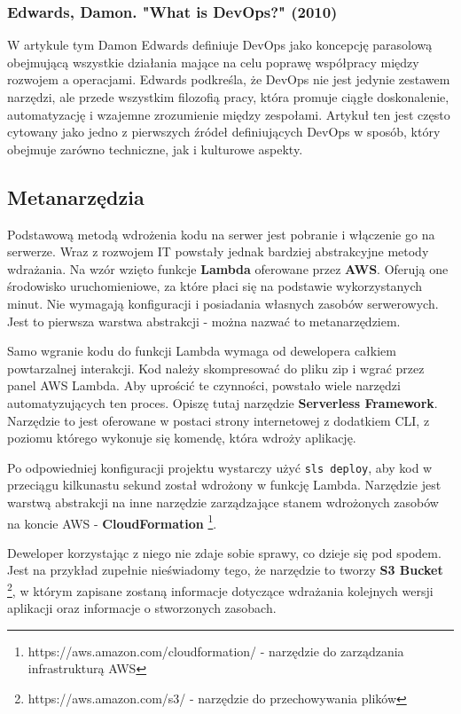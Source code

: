 \documentclass{article}
\begin{document}
\subsubsection{Edwards, Damon. "What is DevOps?" (2010)\cite{damonEdwards}}
W artykule tym Damon Edwards definiuje DevOps jako koncepcję parasolową obejmującą wszystkie działania mające na celu poprawę współpracy między rozwojem a operacjami. Edwards podkreśla, że DevOps nie jest jedynie zestawem narzędzi, ale przede wszystkim filozofią pracy, która promuje ciągłe doskonalenie, automatyzację i wzajemne zrozumienie między zespołami. Artykuł ten jest często cytowany jako jedno z pierwszych źródeł definiujących DevOps w sposób, który obejmuje zarówno techniczne, jak i kulturowe aspekty.

\subsection{Metanarzędzia} \label{subsectionMetaNarzedzia}

Podstawową metodą wdrożenia kodu na serwer jest pobranie i włączenie go na serwerze. Wraz z rozwojem IT powstały jednak bardziej abstrakcyjne metody wdrażania. Na wzór wzięto funkcje \textbf{Lambda} oferowane przez \textbf{AWS}. Oferują one środowisko uruchomieniowe, za które płaci się na podstawie wykorzystanych minut. Nie wymagają konfiguracji i posiadania własnych zasobów serwerowych. Jest to pierwsza warstwa abstrakcji - można nazwać to metanarzędziem.

Samo wgranie kodu do funkcji Lambda wymaga od dewelopera całkiem powtarzalnej interakcji. Kod należy skompresować do pliku zip i wgrać przez panel AWS Lambda. Aby uprościć te czynności, powstało wiele narzędzi automatyzujących ten proces. Opiszę tutaj narzędzie \textbf{Serverless Framework}. Narzędzie to jest oferowane w postaci strony internetowej z dodatkiem CLI, z poziomu którego wykonuje się komendę, która wdroży aplikację.

Po odpowiedniej konfiguracji projektu wystarczy użyć \lstinline|sls deploy|, aby kod w przeciągu kilkunastu sekund został wdrożony w funkcję Lambda. Narzędzie jest warstwą abstrakcji na inne narzędzie zarządzające stanem wdrożonych zasobów na koncie AWS - \textbf{CloudFormation} \footnote{https://aws.amazon.com/cloudformation/ - narzędzie do zarządzania infrastrukturą AWS}.

Deweloper korzystając z niego nie zdaje sobie sprawy, co dzieje się pod spodem. Jest na przykład zupełnie nieświadomy tego, że narzędzie to tworzy \textbf{S3 Bucket} \footnote{https://aws.amazon.com/s3/ - narzędzie do przechowywania plików}, w którym zapisane zostaną informacje dotyczące wdrażania kolejnych wersji aplikacji oraz informacje o stworzonych zasobach.
\end{document}
